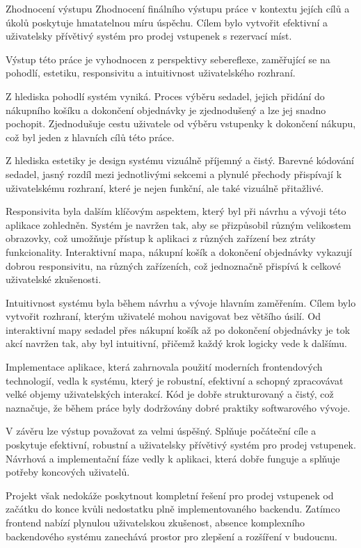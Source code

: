 \begin{section}{Zhodnocení výstupu}
    \label{sec:zaver-zhodnoceni}
    Zhodnocení finálního výstupu práce v kontextu jejích cílů a úkolů poskytuje hmatatelnou míru úspěchu.
    Cílem bylo vytvořit efektivní a uživatelsky přívětivý systém pro prodej vstupenek s rezervací míst.

    Výstup této práce je vyhodnocen z perspektivy sebereflexe, zaměřující se na pohodlí, estetiku, responsivitu a intuitivnost uživatelského rozhraní.

    Z hlediska pohodlí systém vyniká.
    Proces výběru sedadel, jejich přidání do nákupního košíku a dokončení objednávky je zjednodušený a lze jej snadno pochopit.
    Zjednodušuje cestu uživatele od výběru vstupenky k dokončení nákupu, což byl jeden z hlavních cílů této práce.

    Z hlediska estetiky je design systému vizuálně příjemný a čistý.
    Barevné kódování sedadel, jasný rozdíl mezi jednotlivými sekcemi a plynulé přechody přispívají k uživatelskému rozhraní, které je nejen funkční, ale také vizuálně přitažlivé.

    Responsivita byla dalším klíčovým aspektem, který byl při návrhu a vývoji této aplikace zohledněn.
    Systém je navržen tak, aby se přizpůsobil různým velikostem obrazovky, což umožňuje přístup k aplikaci z různých zařízení bez ztráty funkcionality.
    Interaktivní mapa, nákupní košík a dokončení objednávky vykazují dobrou responsivitu, na různých zařízeních, což jednoznačně přispívá k celkové uživatelské zkušenosti.

    Intuitivnost systému byla během návrhu a vývoje hlavním zaměřením.
    Cílem bylo vytvořit rozhraní, kterým uživatelé mohou navigovat bez většího úsilí.
    Od interaktivní mapy sedadel přes nákupní košík až po dokončení objednávky je tok akcí navržen tak, aby byl intuitivní, přičemž každý krok logicky vede k dalšímu.

    Implementace aplikace, která zahrnovala použití moderních frontendových technologií, vedla k systému, který je robustní, efektivní a schopný zpracovávat velké objemy uživatelských interakcí.
    Kód je dobře strukturovaný a čistý, což naznačuje, že během práce byly dodržovány dobré praktiky softwarového vývoje.

    V závěru lze výstup považovat za velmi úspěšný.
    Splňuje počáteční cíle a poskytuje efektivní, robustní a uživatelsky přívětivý systém pro prodej vstupenek.
    Návrhová a implementační fáze vedly k aplikaci, která dobře funguje a splňuje potřeby koncových uživatelů.

    Projekt však nedokáže poskytnout kompletní řešení pro prodej vstupenek od začátku do konce kvůli nedostatku plně implementovaného backendu.
    Zatímco frontend nabízí plynulou uživatelskou zkušenost, absence komplexního backendového systému zanechává prostor pro zlepšení a rozšíření v budoucnu.
\end{section}

